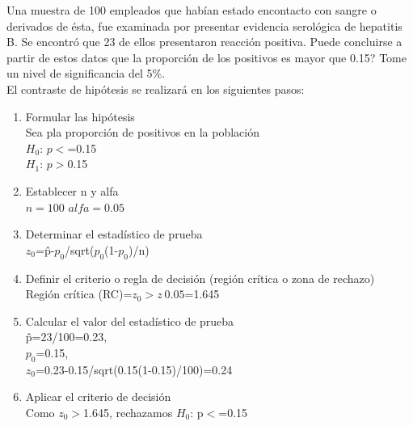 \documentclass[12pt,letterpaper]{article}\usepackage[]{graphicx}\usepackage[]{color}
\begin{document}
Una muestra de 100 empleados que hab\'ian estado encontacto con sangre o derivados de \'esta, fue examinada por presentar evidencia serol\'ogica de hepatitis B. Se encontr\'o que 23 de ellos presentaron reacci\'on positiva. \¿Puede concluirse a partir de estos datos que la proporci\'on de los positivos es mayor que 0.15? Tome un nivel de significancia del 5\%.\\

El contraste de hip\'otesis se realizar\'a en los siguientes pasos:
\begin{enumerate}
  \item Formular las hip\'otesis\\
  Sea pla proporci\'on de positivos en la poblaci\'on\\
  $H_0$: $p$$<$=0.15\\
  $H_1$: $p$$>$0.15
  \item Establecer n y alfa\\
  $n=100$ $alfa=0.05$
  \item Determinar el estad\'istico de prueba\\
  $z_0$=\^ p-$p_0$/sqrt($p_0$(1-$p_0$)/n)
  \item Definir el criterio o regla de decisi\'on (regi\'on cr\'itica o zona de rechazo)\\
  Regi\'on cr\'itica (RC)={$z_0$$>$$z_\ 0.05$=1.645}
  \item Calcular el valor del estad\'istico de prueba\\
  \^ p=23/100=0.23,\\
  $p_0$=0.15,\\
  $z_0$=0.23-0.15/sqrt(0.15(1-0.15)/100)=0.24
  \item Aplicar el criterio de decisi\'on\\
  Como $z_0$$>$1.645, rechazamos $H_0$: p$<$=0.15
\end{enumerate}
\end{document}
